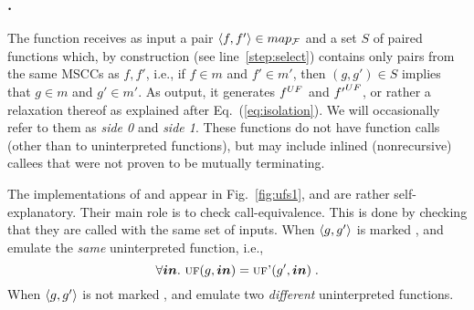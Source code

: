 
\subsubsection{.}
The function  receives as input a pair $\langle f,f'\rangle \in map_{\cal F}$ and
a set $S$ of paired functions which, by construction (see
line~\ref{step:select}) contains only pairs from the same MSCCs as $f,f'$,
i.e., if $f \in m$ and $f' \in m'$, then $(g,g') \in S$ implies that $g \in m$
and $g' \in m'$. As output, it generates ${f}^{UF}$ and ${f'}^{UF}$, or
rather a relaxation thereof as explained after Eq.~(\ref{eq:isolation}). We
will occasionally refer to them as \emph{side 0} and \emph{side 1}. These
functions do not have function calls (other than to uninterpreted functions),
but may include inlined (nonrecursive) callees that were not proven to be
mutually terminating.


The implementations of \pneufname and \pneufpname appear in Fig.~\ref{fig:ufs1}, and are rather self-explanatory. Their main role is to check call-equivalence. This is done by checking that they are called with the same set of inputs. When $\langle g,g'\rangle$ is marked \equivlabel, \pneufname and \pneufpname emulate the \emph{same} uninterpreted function, i.e.,
\[\forall \vec{in}.\ \mbox{{\sc uf}}(g, \vec{in}) = \mbox{{\sc uf'}}(g', \vec{in})\;.\]
 When $\langle g,g'\rangle$ is not marked \equivlabel, \pneufname and \pneufpname emulate two \emph{different} uninterpreted functions.



